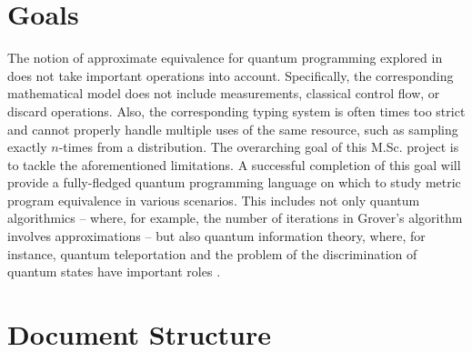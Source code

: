 \section{Goals}
The notion of approximate equivalence for quantum programming explored in \cite{dahlqvist2022syntactic} does not take important operations into account. Specifically, the corresponding mathematical model does not include measurements, classical control flow, or discard operations. Also, the corresponding typing system is often times too strict and cannot properly handle multiple uses of the same resource, such as sampling exactly $n$-times from a distribution. The overarching goal of this M.Sc. project is to tackle the aforementioned limitations. A successful completion of this goal will provide a fully-fledged quantum programming language on which to study metric program equivalence in various scenarios. This includes not only quantum algorithmics – where, for example, the number of iterations in Grover’s algorithm involves approximations – but also quantum information theory, where, for instance, quantum teleportation and the problem
of the discrimination of quantum states have important roles \cite{nielsen2010quantum}.


\section{Document Structure}
